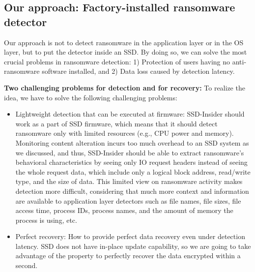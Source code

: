 \documentclass[conference]{IEEEtran}
\newcommand{\eg}{e.g.,\xspace}
\newcommand{\ours}{SSD-Insider}
\begin{document}
\subsection{Our approach: Factory-installed ransomware detector}
Our approach is not to detect ransomware in the application layer or in
the OS layer, but to put the detector inside an SSD. By doing so,
we can solve the most crucial problems in ransomware detection: 
1) Protection of users having no anti-ransomware software installed, 
and 2) Data loss caused by detection latency.

{\bf Two challenging problems for detection and for recovery:}
To realize the idea, we have to solve the following challenging
problems: 
\begin{itemize}
    \item Lightweight detection that can be executed at firmware: 
    \ours{} should work as a part of SSD firmware, which means that it should
    detect ransomware only with limited resources (\eg CPU power and memory). 
    Monitoring content alteration incurs too much overhead to an SSD system as we discussed,
    and thus, \ours{} should be able to extract ransomware's behavioral characteristics
    by seeing only IO request headers instead of seeing the whole request data, 
    which include only a logical block address, read/write type, and the size of data. 
    This limited view on ransomware activity makes detection more difficult,
    considering that much more context and information are available to application layer detectors 
    such as file names, file sizes, file access time, process IDs, process names, and the amount of memory 
    the process is using, etc. 
    \item Perfect recovery: How to provide perfect data recovery even under detection latency. 
    SSD does not have in-place update capability, so we are going to take advantage of the property
    to perfectly recover the data encrypted within a second.
\end{itemize}
\end{document}
